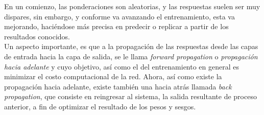 \begin{itemize}
{\begin{enumerate}
\begin{enumerate}
            En un comienzo, las ponderaciones son aleatorias, y las respuestas suelen ser muy dispares, sin embargo, y conforme va avanzando el entrenamiento, esta va mejorando, haciéndose más precisa en predecir o replicar a partir de los resultados conocidos.\\
            
            Un aspecto importante, es que a la propagación de las respuestas desde las capas de entrada hacia la capa de salida, se le llama \textit{forward propagation} o \textit{propagación hacia adelante} y cuyo objetivo, así como el del entrenamiento en general es minimizar el costo computacional de la red. Ahora, así como existe la propagación hacia adelante, existe también una hacia atrás llamada \textit{back propagation}, que consiste en reingresar al sistema, la salida resultante de proceso anterior, a fin de optimizar el resultado de los pesos y sesgos. 
            \end{enumerate}
        \end{enumerate}
            }
    \end{itemize}
    